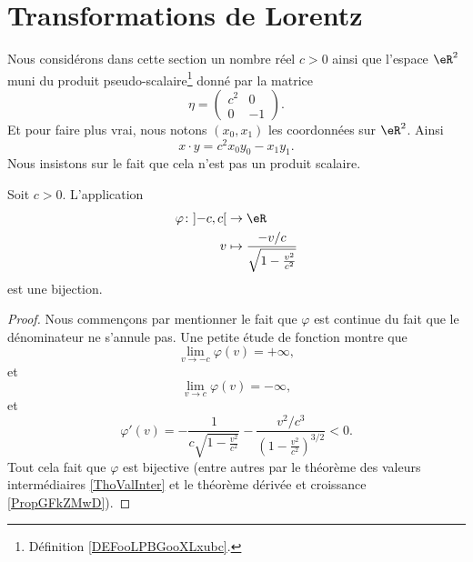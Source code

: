 

\section{Transformations de Lorentz}

Nous considérons dans cette section un nombre réel \( c>0\) ainsi que l'espace \( \eR^2\) muni du produit pseudo-scalaire\footnote{Définition \ref{DEFooLPBGooXLxubc}.} donné par la matrice
\begin{equation}
	\eta=\begin{pmatrix}
		c^2 & 0  \\
		0   & -1
	\end{pmatrix}.
\end{equation}
Et pour faire plus vrai, nous notons \( (x_0,x_1)\) les coordonnées sur \( \eR^2\). Ainsi
\begin{equation}
	x\cdot y=c^2x_0y_0-x_1y_1.
\end{equation}
Nous insistons sur le fait que cela n'est pas un produit scalaire.

\begin{lemma}        \label{LEMooPZPZooVAdPVj}
	Soit \( c>0\). L'application
	\begin{equation}
		\begin{aligned}
			\varphi\colon \mathopen] -c , c \mathclose[ & \to \eR                                                 \\
			v                                           & \mapsto \frac{ -v/c }{ \sqrt{ 1-\frac{ v^2 }{ c^2 } } }
		\end{aligned}
	\end{equation}
	est une bijection.
\end{lemma}

\begin{proof}
	Nous commençons par mentionner le fait que \( \varphi\) est continue du fait que le dénominateur ne s'annule pas. Une petite étude de fonction montre que
	\begin{equation}
		\lim_{v\to -c} \varphi(v)=+\infty,
	\end{equation}
	et
	\begin{equation}
		\lim_{v\to c} \varphi(v)=-\infty,
	\end{equation}
	et
	\begin{equation}
		\varphi'(v)=-\frac{1}{ c\sqrt{ 1-\frac{ v^2 }{ c^2 } } }-\frac{ v^2/c^3 }{ \left( 1-\frac{ v^2 }{ c^2 } \right)^{3/2} }<0.
	\end{equation}
	Tout cela fait que \( \varphi\) est bijective (entre autres par le théorème des valeurs intermédiaires \ref{ThoValInter} et le théorème dérivée et croissance \ref{PropGFkZMwD}).
\end{proof}

